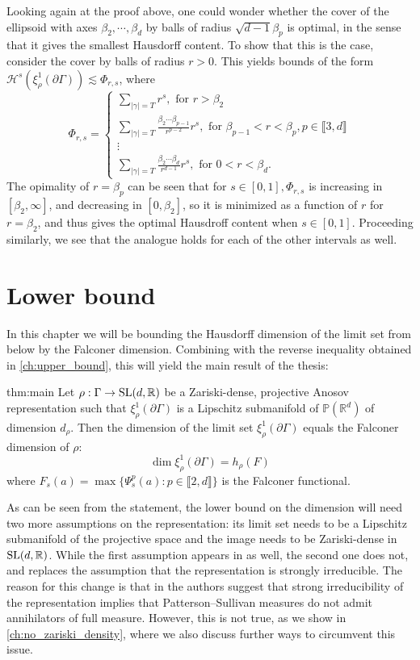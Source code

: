 \documentclass{report}
\begin{document}
Looking again at the proof above, one could wonder whether the cover of the ellipsoid with axes $\beta_2, \cdots, \beta_d$ by balls of radius $\sqrt{d-1} \beta_p$ is optimal, in the sense that it gives the smallest Hausdorff content.
To show that this is the case, consider the cover by balls of radius $r>0$. 
This yields bounds of the form $\mathcal H^s(\xi_\rho^1(\partial \Gamma)) \lesssim \Phi_{r,s}$, where
\[
\Phi_{r,s} = \begin{cases}
    \sum_{|\gamma| = T} r^s, \text{ for } r > \beta_2\\
    \sum_{|\gamma| = T}  \frac{\beta_2 \cdots \beta_{p-1}}{r^{p-2}}  r^s, \text{ for } \beta_{p-1} < r < \beta_p, p \in \llbracket 3, d \rrbracket\\
    \vdots\\
    \sum_{|\gamma| = T}  \frac{\beta_2 \cdots \beta_{d}}{r^{d-1}} r^s, \text{ for } 0 < r < \beta_d.
\end{cases}
\]
The opimality of $r = \beta_p$ can be seen that for $s \in [0,1], \Phi_{r,s}$ is increasing in $[\beta_2, \infty]$, and decreasing in $[0, \beta_2]$, so it is minimized as a function of $r$ for $r = \beta_2$, and thus gives the optimal Hausdroff content when $s \in [0,1]$.
Proceeding similarly, we see that the analogue holds for each of the other intervals as well.

\chapter{Lower bound}\label{ch:lower_bound}
In this chapter we will be bounding the Hausdorff dimension of the limit set from below by the Falconer dimension.
Combining with the reverse inequality obtained in \cref{ch:upper_bound}, this will yield the main result of the thesis:
\begin{reptheorem}{thm:main}
    Let $\rho: \Gamma \to \operatorname{{\mathrm{SL}}}(d, \mathbb R)$ be a Zariski-dense, projective Anosov representation such that $\xi^1_\rho(\partial \Gamma)$ is a Lipschitz submanifold of $\mathbb P(\mathbb R^d)$ of dimension $d_\rho$.
    Then the dimension of the limit set $\xi_\rho^1(\partial \Gamma)$ equals the Falconer dimension of $\rho$:
    \[
        \dim \xi_\rho^1(\partial \Gamma) = h_\rho(F)
    \]
    where $F_s(a) = \max \{ \Psi_s^p(a) : p \in \llbracket 2, d \rrbracket\}$ is the Falconer functional.
\end{reptheorem}
As can be seen from the statement, the lower bound on the dimension will need two more assumptions on the representation: its limit set needs to be a Lipschitz submanifold of the projective space and the image needs to be Zariski-dense in $\operatorname{{\mathrm{SL}}}(d, \mathbb R)$.
While the first assumption appears in \cite{pozzetti_anosov_2023} as well, the second one does not, and replaces the assumption that the representation is strongly irreducible.
The reason for this change is that in \cite{pozzetti_anosov_2023} the authors suggest that strong irreducibility of the representation implies that Patterson--Sullivan measures do not admit annihilators of full measure.
However, this is not true, as we show in \cref{ch:no_zariski_density}, where we also discuss further ways to circumvent this issue.
\end{document}
